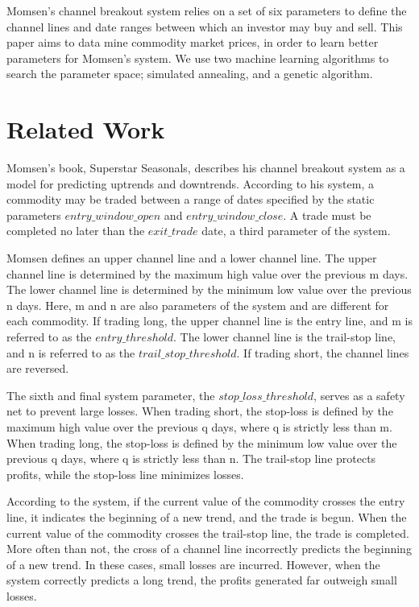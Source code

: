 \documentclass[12pt]{article}
\begin{document}
Momsen's channel breakout system relies on a set of six parameters to define
the channel lines and date ranges between which an investor may buy and sell.
This paper aims to data mine commodity market prices, in order to learn better
parameters for Momsen's system. We use two machine learning algorithms to
search the parameter space; simulated annealing, and a genetic algorithm.

\vspace{-15pt}

\section{Related Work}

\vspace{-5pt}

Momsen's book, Superstar Seasonals, describes his channel breakout system as a
model for predicting uptrends and downtrends.  According to his system, a
commodity may be traded between a range of dates specified by the static
parameters $entry\_window\_open$ and $entry\_window\_close$.  A trade must be
completed no later than the $exit\_trade$ date, a third parameter of the
system.

Momsen defines an upper channel line and a lower channel line.  The upper
channel line is determined by the maximum high value over the previous m days.
The lower channel line is determined by the minimum low value over the previous
n days.  Here, m and n are also parameters of the system and are different for
each commodity.  If trading long, the upper channel line is the entry line, and
m is referred to as the $entry\_threshold$. The lower channel line is the
trail-stop line, and n is referred to as the $trail\_stop\_threshold$.  If
trading short, the channel lines are reversed.

The sixth and final system parameter, the $stop\_loss\_threshold$, serves as a
safety net to prevent large losses.  When trading short, the stop-loss is
defined by the maximum high value over the previous q days, where q is
strictly less than m.  When trading long, the stop-loss is defined by the
minimum low value over the previous q days, where q is strictly less than
n.  The trail-stop line protects profits, while the stop-loss line minimizes
losses.

According to the system, if the current value of the commodity crosses the entry
line, it indicates the beginning of a new trend, and the trade is begun.  When
the current value of the commodity crosses the trail-stop line, the trade is
completed.  More often than not, the cross of a channel line incorrectly
predicts the beginning of a new trend.  In these cases, small losses are incurred.
However, when the system correctly predicts a long trend, the profits generated
far outweigh small losses.
\end{document}

